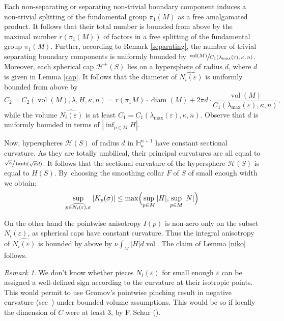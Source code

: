 \documentclass[JEP,XML,SOM,Unicode]{cedram}
\let\mathcal\mathscr
\DeclareMathOperator{\diam}{diam}
\DeclareMathOperator{\vol}{vol}
\theoremstyle{definition}
\theoremstyle{remark}
\newtheorem{remark}[theorem]{Remark}
\numberwithin{equation}{section}
\begin{document}
Each non-separating or separating non-trivial boundary component induces a non-trivial splitting of the
fundamental group $\pi_1(M)$ as a free amalgamated product. It follows that their total number is bounded from above by the
maximal number $r(\pi_1(M))$ of factors in a free splitting of the
fundamental group $\pi_1(M)$. Further, accor\-ding to Remark \ref{separating}, the number of trivial separating boundary components is uniformly bounded by $\sfrac{\vol(M)}{C_1(\lambda_{\max}(\varepsilon),\kappa,n)}$.
Moreover, each spherical cap $\mathcal H^+(S)$ lies on a hypersphere of radius $d$, where $d$ is given in Lemma \ref{cap}.
It follows that the diameter of $\widehat{N_i(\varepsilon)}$ is uniformly bounded from above by
\[ C_2=C_2(\vol(M),\lambda,H, \kappa,n)=
r(\pi_1M)\cdot \diam(M) + 2\pi d\cdot \frac{\vol(M)}{C_1(\lambda_{\max}(\varepsilon),\kappa,n)},\]
while the volume $\widehat{N_i(\varepsilon)}$ is at least
$C_1=C_1(\lambda_{\max}(\varepsilon), \kappa, n)$. Observe that $d$ is uniformly bounded
in terms of $|\inf_{p\in M}H|$.

Now, hyperspheres $\mathcal H(S)$ of radius $d$ in $\mathbb H^{n+1}_{\kappa}$ have
constant sectional curvature. As they are totally umbilical, their principal curvatures
are all equal to $\sfrac{\sqrt{\kappa}}{\tanh(\sqrt{\kappa}d)}$. It follows that the sectional curvature
of the hypersphere $\mathcal H(S)$ is equal to $H(S)$. By~choosing the
smoothing collar $F$ of $S$ of small enough width we obtain:
\[\sup_{p\in \widehat{N_i(\varepsilon)}, \sigma}|K_p(\sigma)|
\leq
\max\Bigl(\sup_{p\in M}|H|,\sup_{p\in M}|N|\Bigr)\]

On the other hand the pointwise anisotropy $I(p)$ is non-zero
only on the subset $N_i(\varepsilon)$, as spherical caps have
constant curvature. Thus the integral anisotropy
of $\widehat{N_i(\varepsilon)}$ is
bounded by above by $\nu\int_M |H| d\vol$.
The claim of Lemma \ref{niko} follows.

\begin{remark}
We don't know whether pieces $N_i(\varepsilon)$
for small enough $\varepsilon$ can be assigned a well-defined
sign according to the curvature at their
isotropic points. This would permit to use
Gromov's pointwise pinching result in negative curvature (see~\cite{Gro})
under bounded volume assumptions.
This would be so if locally the dimension of $C$ were at least $3$,
by F.\,Schur (\cite{Sch}).
\end{remark}
\end{document}
